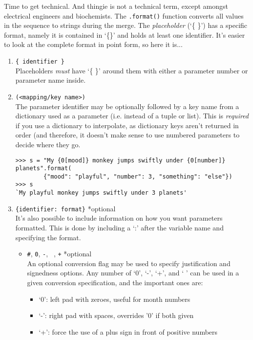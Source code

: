 Time to get technical. And thingie is not a technical term, except   amongst electrical engineers and biochemists. The \texttt{.format()} function converts      all values in the sequence to strings   during the merge. The \textit{placeholder} (`\{ \}') has a specific format, namely it is contained in `\{\}'   and holds at least one identifier. It's easier to look at the complete format in point form, so here it is...
\begin{enumerate}
	\item 
\texttt{\{ identifier \}}
\\        Placeholders  \textit{must} have `\{ \}' around them with        either a parameter number or parameter name inside.
	\item 
\texttt{(<mapping/key name>)} 
\\        The parameter identifier may be optionally followed by a key name from a dictionary    used as a parameter (i.e. instead of a tuple or list). This    is \textit{required} if you use a dictionary to    interpolate, as dictionary keys aren't returned in order (and therefore,       it doesn't make sense to use numbered parameters to decide where they go. 
\begin{lstlisting}
>>> s = "My {0[mood]} monkey jumps swiftly under {0[number]} planets".format(
        {"mood": "playful", "number": 3, "something": "else"})
>>> s
`My playful monkey jumps swiftly under 3 planets'
\end{lstlisting}
	\item 
\texttt{\{identifier: format\}} *optional
\\       It's also possible to include information on how you want parameters formatted.       This is done by including a `:' after the variable name and specifying the format.        
\begin{itemize}
	\item 
\texttt{\#}, 
\texttt{0}, 
\texttt{-},    
\texttt{ }, 
\texttt{+} *optional
\\        An optional conversion flag may be used to specify justification    and signedness options. Any number of `0', `-', `+', and ` '    can be used in a given conversion specification, and the important    ones are:      
\begin{itemize}
	\item `0': left pad with zeroes, useful for month      numbers
	\item `-': right pad with spaces, overrides '0' if both      given
	\item `+': force the use of a plus sign in front of positive      numbers

\end{itemize}
\end{itemize}
\end{enumerate}
